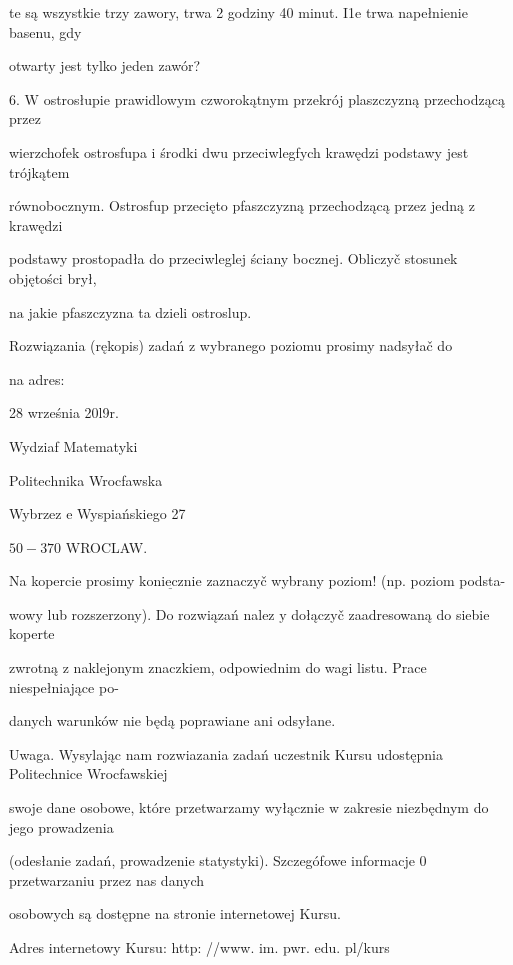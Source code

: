 \documentclass[a4paper,12pt]{article}
\begin{document}
te są wszystkie trzy zawory, trwa 2 godziny 40 minut. I1e trwa napełnienie basenu, gdy

otwarty jest tylko jeden zawór?

6. $\mathrm{W}$ ostrosłupie prawidlowym czworokątnym przekrój plaszczyzną przechodzącą przez

wierzchofek ostrosfupa $\mathrm{i}$ środki dwu przeciwlegfych krawędzi podstawy jest trójkątem

równobocznym. Ostrosfup przecięto pfaszczyzną przechodzącą przez jedną $\mathrm{z}$ krawędzi

podstawy prostopadła do przeciwleglej ściany bocznej. Obliczyč stosunek objętości brył,

$\mathrm{n}\mathrm{a}$ jakie pfaszczyzna ta dzieli ostroslup.

Rozwiązania (rękopis) zadań z wybranego poziomu prosimy nadsyłač do

na adres:

28 września 20l9r.

Wydziaf Matematyki

Politechnika Wrocfawska

Wybrzez $\mathrm{e}$ Wyspiańskiego 27

$50-370$ WROCLAW.

Na kopercie prosimy $\underline{\mathrm{k}\mathrm{o}\mathrm{n}\mathrm{i}\mathrm{e}\mathrm{c}\mathrm{z}\mathrm{n}\mathrm{i}\mathrm{e}}$ zaznaczyč wybrany poziom! (np. poziom podsta-

wowy lub rozszerzony). Do rozwiązań nalez $\mathrm{y}$ dołączyč zaadresowaną do siebie koperte

zwrotną $\mathrm{z}$ naklejonym znaczkiem, odpowiednim do wagi listu. Prace niespełniające po-

danych warunków nie będą poprawiane ani odsyłane.

Uwaga. Wysylając nam rozwiazania zadań uczestnik Kursu udostępnia Politechnice Wrocfawskiej

swoje dane osobowe, które przetwarzamy wyłącznie $\mathrm{w}$ zakresie niezbędnym do jego prowadzenia

(odesłanie zadań, prowadzenie statystyki). Szczegófowe informacje $0$ przetwarzaniu przez nas danych

osobowych są dostępne na stronie internetowej Kursu.

Adres internetowy Kursu: http: //www. im. pwr. edu. pl/kurs
\end{document}

